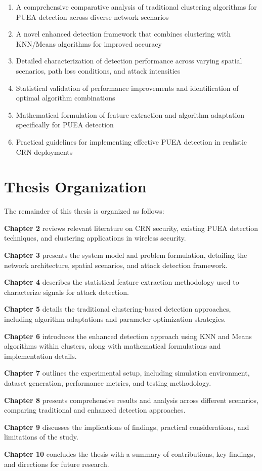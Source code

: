 \begin{enumerate}
    \item A comprehensive comparative analysis of traditional clustering algorithms for PUEA detection across diverse network scenarios
    \item A novel enhanced detection framework that combines clustering with KNN/Means algorithms for improved accuracy
    \item Detailed characterization of detection performance across varying spatial scenarios, path loss conditions, and attack intensities
    \item Statistical validation of performance improvements and identification of optimal algorithm combinations
    \item Mathematical formulation of feature extraction and algorithm adaptation specifically for PUEA detection
    \item Practical guidelines for implementing effective PUEA detection in realistic CRN deployments
\end{enumerate}

\section{Thesis Organization}

The remainder of this thesis is organized as follows:

\textbf{Chapter 2} reviews relevant literature on CRN security, existing PUEA detection techniques, and clustering applications in wireless security.

\textbf{Chapter 3} presents the system model and problem formulation, detailing the network architecture, spatial scenarios, and attack detection framework.

\textbf{Chapter 4} describes the statistical feature extraction methodology used to characterize signals for attack detection.

\textbf{Chapter 5} details the traditional clustering-based detection approaches, including algorithm adaptations and parameter optimization strategies.

\textbf{Chapter 6} introduces the enhanced detection approach using KNN and Means algorithms within clusters, along with mathematical formulations and implementation details.

\textbf{Chapter 7} outlines the experimental setup, including simulation environment, dataset generation, performance metrics, and testing methodology.

\textbf{Chapter 8} presents comprehensive results and analysis across different scenarios, comparing traditional and enhanced detection approaches.

\textbf{Chapter 9} discusses the implications of findings, practical considerations, and limitations of the study.

\textbf{Chapter 10} concludes the thesis with a summary of contributions, key findings, and directions for future research.
